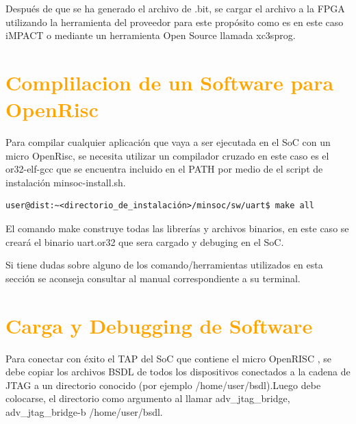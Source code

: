 Después de que se ha generado el archivo de .bit, se cargar el archivo a la FPGA utilizando la herramienta del proveedor para este propósito como es en este caso iMPACT o mediante un herramienta Open Source llamada xc3sprog. 

\section{\textcolor{orange}{Complilacion de un Software para OpenRisc}}

Para compilar cualquier aplicación que vaya a ser ejecutada en el SoC con un micro OpenRisc, se necesita utilizar un compilador cruzado en este caso es el or32-elf-gcc que se encuentra incluido en el PATH por medio de el script de instalación minsoc-install.sh.

\begin{verbatim}
user@dist:~<directorio_de_instalación>/minsoc/sw/uart$ make all
\end{verbatim}
 
El comando make construye todas las librerías y archivos binarios, en este caso se creará el binario uart.or32 que sera cargado y debuging en el SoC.
 

Si tiene dudas sobre alguno de los comando/herramientas utilizados en esta sección se aconseja consultar al manual correspondiente a su terminal.


\section{\textcolor{orange}{Carga y Debugging de Software}}


Para conectar con éxito el TAP del SoC que contiene el micro OpenRISC , se debe copiar los archivos BSDL de todos los dispositivos conectados a la cadena de JTAG a un directorio conocido (por ejemplo /home/user/bsdl).Luego debe colocarse, el directorio como argumento al llamar adv\_jtag\_bridge, adv\_jtag\_bridge-b /home/user/bsdl.


